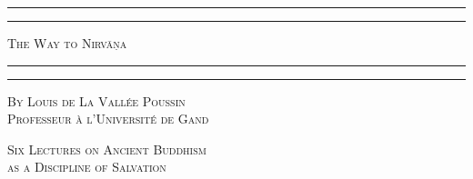 \documentclass[a4paper, 11pt, oneside, english]{article}
\begin{document}
\renewcommand{\thefigure}{{\bfseries\arabic{figure}}}
\renewcommand\thefootnote{\tiny{\arabic{footnote}}}
\let\oldfootnote\footnote
    \renewcommand{\footnote}[1]{\oldfootnote{\bfseries\footnotesize#1}}
    
\bfseries
\large
\pagestyle{plain} %
\begin{titlepage} %
	\centering %


	\rule{\textwidth}{1.6pt}\vspace*{-\baselineskip}\vspace*{2pt} %
	\rule{\textwidth}{0.4pt} %
	
	\vspace{1\baselineskip} %
	
	{\scshape\Huge The Way to Nirvāṇa}
	
	\vspace{1\baselineskip} %

	\rule{\textwidth}{0.4pt}\vspace*{-\baselineskip}\vspace{3.2pt} %
	\rule{\textwidth}{1.6pt} %
	
	\vspace{1\baselineskip} %
	
	
        {\scshape\Large By Louis de La Vallée Poussin\\\small Professeur à l'Université de Gand}
 
        \vspace{1.0\baselineskip}
		
        {\scshape \scriptsize Six Lectures on Ancient Buddhism \\ as a Discipline of Salvation} %

        \vspace*{\fill}    


\end{titlepage}
\end{document}
